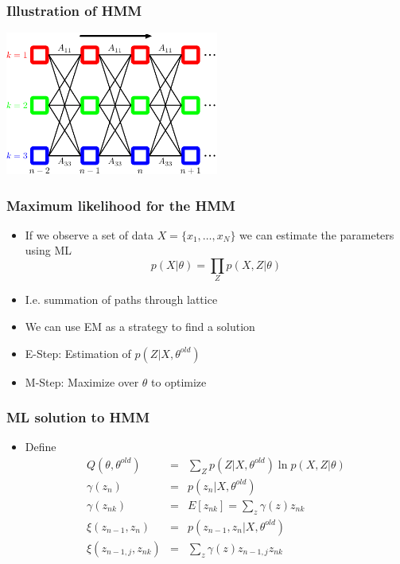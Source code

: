 \documentclass[10pt]{beamer}
\begin{document}
\begin{frame}
  \frametitle{Illustration of HMM}
  \begin{center}
    \includegraphics[width=7cm]{prml-Figure13-7}
  \end{center}
\end{frame}


\begin{frame}
  \frametitle{Maximum likelihood for the HMM}
  \begin{itemize}
  \item If we observe a set of data $X=\{ x_1, \ldots, x_N\}$ we can
    estimate the parameters using ML
    \[ p(X|\theta)=\prod_Z p(X, Z| \theta) \]
  \item I.e. summation of paths through lattice
  \item We can use EM as a strategy to find a solution
  \item E-Step: Estimation of $p(Z|X, \theta^{old})$
  \item M-Step: Maximize over $\theta$ to optimize
  \end{itemize}
\end{frame}

\begin{frame}
  \frametitle{ML solution to HMM}
  \begin{itemize}
  \item Define
    \begin{eqnarray*}
      Q(\theta,\theta^{old})&=&\sum_Z p(Z|X, \theta^{old}) \ln p(X,Z|\theta)\\
      \gamma(z_n)&=& p(z_n|X, \theta^{old})\\
      \gamma(z_{nk}) &=& E[z_{nk}] = \sum_z \gamma(z) z_{nk}\\
      \xi(z_{n-1}, z_n) &=& p(z_{n-1}, z_n| X, \theta^{old})\\
      \xi(z_{n-1,j}, z_{nk}) &=& \sum_z \gamma(z) z_{n-1,j} z_{nk}
    \end{eqnarray*}
  \end{itemize}
\end{frame}
\end{document}
